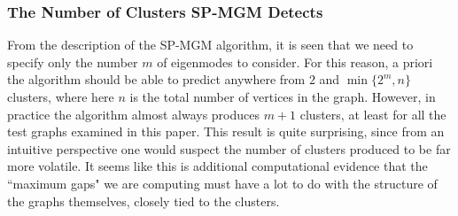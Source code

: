 \documentclass[10pt,journal,compsoc]{IEEEtran} %
\theoremstyle{definition}
\begin{document}

\subsubsection{The Number of Clusters SP-MGM Detects}
From the description of the SP-MGM algorithm, it is seen that we need
to specify only the number $m$ of eigenmodes to consider.  For this
reason, a priori the algorithm should be able to predict anywhere from
$2$ and $\min\{2^m,n\}$ clusters, where here $n$ is the total number
of vertices in the graph.  However, in practice the algorithm almost
always produces $m+1$ clusters, at least for all the test graphs
examined in this paper.  This result is quite surprising, since from
an intuitive perspective one would suspect the number of clusters
produced to be far more volatile.  It seems like this is additional
computational evidence that the ``maximum gaps" we are computing must
have a lot to do with the structure of the graphs themselves, closely
tied to the clusters.
\end{document}
